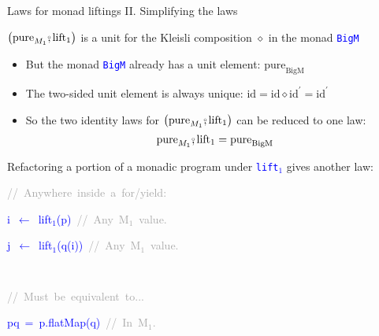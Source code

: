 \documentclass[english]{beamer}
\newenvironment{lyxcode}
  {\par\begin{list}{}{
    \setlength{\rightmargin}{\leftmargin}
    \setlength{\listparindent}{0pt}%
    \raggedright
    \setlength{\itemsep}{0pt}
    \setlength{\parsep}{0pt}
    \normalfont\ttfamily}%
   \def\{{\char`\{}
   \def\}{\char`\}}
   \def\textasciitilde{\char`\~}
   \item[]}
  {\end{list}}
\newcommand{\bef}{\ensuremath\raisebox{2pt}{$\mathsmaller{\mathsmaller{\circ}}$}\hspace{-3.3pt},}
\begin{document}
\begin{frame}{Laws for monad liftings II. Simplifying the laws}

$\big(\text{pure}_{M_{1}}\bef\text{lift}_{1}\big)$ is a unit for
the Kleisli composition $\diamond$ in the monad \texttt{\textcolor{blue}{\footnotesize{}BigM}} 
\begin{itemize}
\item But the monad \texttt{\textcolor{blue}{\footnotesize{}BigM}} already
has a unit element: $\text{pure}_{\text{BigM}}$
\item The two-sided unit element is always unique: $\text{id}=\text{id}\diamond\text{id}^{\prime}=\text{id}^{\prime}$
\item So the two identity laws for $\big(\text{pure}_{M_{1}}\bef\text{lift}_{1}\big)$
can be reduced to one law:{\footnotesize{}
\[
\text{pure}_{M_{1}}\bef\text{lift}_{1}=\text{pure}_{\text{BigM}}
\]
}{\footnotesize\par}
\end{itemize}
Refactoring a portion of a monadic program under \texttt{\textcolor{blue}{\footnotesize{}lift$_{1}$}}
gives another law:

{\footnotesize{}\vspace{-0.2cm}\hspace{-0.0cm}}\texttt{\textcolor{blue}{\footnotesize{}}}%
\begin{minipage}[t]{0.58\columnwidth}%
\begin{lyxcode}
\textrm{\textcolor{darkgray}{\footnotesize{}//~Anywhere~inside~a~for/yield:}}{\footnotesize\par}

\textcolor{blue}{\footnotesize{}i~$\leftarrow$~lift$_{1}$(p)~}\textrm{\textcolor{darkgray}{\footnotesize{}//~Any~M$_{1}$~value.}}{\footnotesize\par}

\textcolor{blue}{\footnotesize{}j~$\leftarrow$~lift$_{1}$(q(i))~}\textrm{\textcolor{darkgray}{\footnotesize{}//~Any~M$_{1}$~value.}}{\footnotesize\par}
\end{lyxcode}
%
\end{minipage}\texttt{\textcolor{blue}{\footnotesize{}~ }}%
\begin{minipage}[t]{0.5\columnwidth}%
\begin{lyxcode}
\textrm{\textcolor{darkgray}{\footnotesize{}//~Must~be~equivalent~to...}}{\footnotesize\par}

\textcolor{blue}{\footnotesize{}pq~=~p.flatMap(q)~}\textrm{\textcolor{darkgray}{\footnotesize{}//~In~M$_{1}$.}}{\footnotesize\par}


\end{lyxcode}
\end{minipage}
\end{frame}
\end{document}
